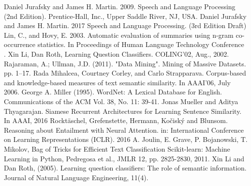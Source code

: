 \documentclass[letterpaper, 10 pt, conference]{ieeeconf}  %
\begin{document}
\begin{thebibliography}{99}

 Daniel Jurafsky and James H. Martin. 2009. Speech and Language Processing (2nd Edition). Prentice-Hall, Inc., Upper Saddle River, NJ, USA.
 Daniel Jurafsky and James H. Martin. 2017 Speech and Language Processing. (3rd Edition Draft) 
 Lin, C., and Hovy, E. 2003. Automatic evaluation of summaries
using n-gram co-occurrence statistics. In Proceedings of Human
Language Technology Conference .
 Xin Li, Dan Roth, Learning Question Classifiers. COLING'02, Aug., 2002.
 Rajaraman, A.; Ullman, J.D. (2011). "Data Mining". Mining of Massive Datasets. pp. 1–17.
 Rada Mihalcea, Courtney Corley, and Carlo Strapparava. Corpus-based and knowledge-based measures of text semantic similarity. In AAAI’06, July 2006.
 George A. Miller (1995). WordNet: A Lexical Database for English. 
Communications of the ACM Vol. 38, No. 11: 39-41.
 Jonas Mueller and Aditya Thyagarajan. Siamese Recurrent Architectures for Learning Sentence Similarity. In AAAI, 2016
 Rocktäschel, Grefenstette, Hermann, Kočiský and Blunsom. Reasoning about Entailment with Neural Attention. in: International Conference on Learning Representations (ICLR). 2016
 A. Joulin, E. Grave, P. Bojanowski, T. Mikolov, Bag of Tricks for Efficient Text Classification
 Scikit-learn: Machine Learning in Python, Pedregosa et al., JMLR 12, pp. 2825-2830, 2011.
 Xin Li and Dan Roth, (2005). Learning question classifiers: The role of semantic information. Journal of Natural Language Engineering, 11(4).
\end{thebibliography}
\end{document}
